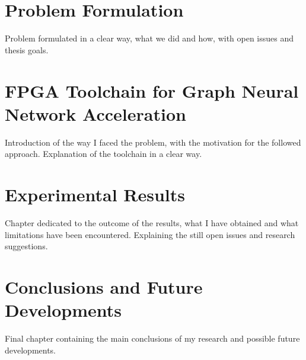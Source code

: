 \documentclass{Configuration_Files/PoliMi3i_thesis}
\begin{document}
    \chapter{Problem Formulation}
    \label{ch:chapter_four}%

    Problem formulated in a clear way, what we did and how, with open issues and thesis goals.



    \chapter{FPGA Toolchain for Graph Neural Network Acceleration}
    \label{ch:chapter_five}%

    Introduction of the way I faced the problem, with the motivation for the followed approach.
    Explanation of the toolchain in a clear way.



    \chapter{Experimental Results}
    \label{ch:chapter_six}%

    Chapter dedicated to the outcome of the results, what I have obtained and what limitations have been encountered.
    Explaining the still open issues and research suggestions.




    \chapter{Conclusions and Future Developments}
    \label{ch:conclusions}%
    Final chapter containing the main conclusions of my research
    and possible future developments.

\end{document}
